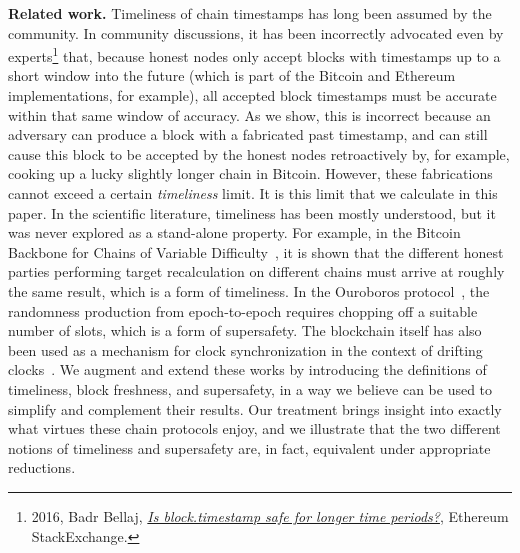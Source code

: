 \noindent
\textbf{Related work.}
Timeliness of chain timestamps has long been assumed by the community.
In community discussions, it has been incorrectly
advocated even by experts\footnote{2016, Badr Bellaj, \href{https://ethereum.stackexchange.com/questions/6795/is-block-timestamp-safe-for-longer-time-periods}{\emph{Is block.timestamp safe for longer time periods?}}, Ethereum StackExchange.} that, because
honest nodes only accept blocks with timestamps up to a short window into the future
(which is part of the Bitcoin and Ethereum implementations, for example),
all accepted block timestamps must be accurate within that same window of accuracy.
As we show, this is incorrect because an adversary can produce a block with a fabricated past timestamp,
and can still cause this block to be accepted by the honest nodes retroactively by, for example, cooking
up a lucky slightly longer chain in Bitcoin. However, these fabrications
cannot exceed a certain \emph{timeliness} limit. It is this limit that we calculate in this paper.
In the scientific literature, timeliness has been mostly understood, but it was never explored
as a stand-alone property. For example, in the Bitcoin Backbone for Chains of Variable Difficulty~\cite{backbone-var},
it is shown that the different honest parties performing target recalculation on different chains
must arrive at roughly the same result, which is a form of timeliness. In the Ouroboros protocol~\cite{ouroboros},
the randomness production from epoch-to-epoch requires chopping off a suitable number of slots,
which is a form of supersafety. The blockchain itself has also been used as a mechanism for clock
synchronization in the context of drifting clocks~\cite{klepsydra,chronos}. We augment and extend
these works by introducing the definitions of timeliness, block freshness, and supersafety, in a way
we believe can be used to simplify and complement their results. Our treatment brings insight into
exactly what virtues these chain protocols enjoy, and we illustrate that the two different
notions of timeliness and supersafety are, in fact, equivalent under appropriate reductions.